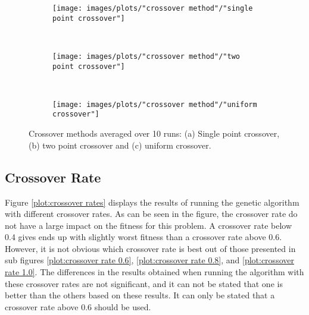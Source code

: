 \begin{figure}[h!]
    \centering
    \begin{subfigure}[b]{0.31\textwidth}
        \texttt{[image: images/plots/"crossover method"/"single point crossover"]}
        \caption{}
        \hfill
        \label{plot:single point crossover}
    \end{subfigure}
    ~
    \begin{subfigure}[b]{0.31\textwidth}
        \texttt{[image: images/plots/"crossover method"/"two point crossover"]}
        \caption{}
        \hfill
        \label{plot:two point crossover}
    \end{subfigure}
    ~
    \begin{subfigure}[b]{0.31\textwidth}
        \texttt{[image: images/plots/"crossover method"/"uniform crossover"]}
        \caption{}
        \hfill
        \label{plot:uniform crossover}
    \end{subfigure}
    \caption{Crossover methods averaged over 10 runs: (a) Single point crossover, (b) two point crossover and (c) uniform crossover.}
    \label{plot:crossover methods}
\end{figure}


\subsection{Crossover Rate}
Figure \ref{plot:crossover rates} displays the results of running the genetic algorithm with different crossover rates. As can be seen in the figure, the crossover rate do not have a large impact on the fitness for this problem. A crossover rate below 0.4 gives ends up with slightly worst fitness than a crossover rate above 0.6. However, it is not obvious which crossover rate is best out of those presented in sub figures \ref{plot:crossover rate 0.6}, \ref{plot:crossover rate 0.8}, and \ref{plot:crossover rate 1.0}. The differences in the results obtained when running the algorithm with these crossover rates are not significant, and it can not be stated that one is better than the others based on these results. It can only be stated that a crossover rate above 0.6 should be used. \\


